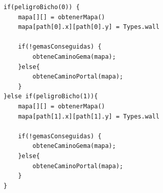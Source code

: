 \documentclass[titlepage]{article}
\begin{document}
\begin{enumerate}
\begin{lstlisting}
if(peligroBicho(0)) {
	mapa[][] = obtenerMapa()
	mapa[path[0].x][path[0].y] = Types.wall
	
	if(!gemasConseguidas) {
		obteneCaminoGema(mapa);
	}else{
		obteneCaminoPortal(mapa);
	}
}else if(peligroBicho(1)){
	mapa[][] = obtenerMapa()
	mapa[path[1].x][path[1].y] = Types.wall
	
	if(!gemasConseguidas) {
		obteneCaminoGema(mapa);
	}else{
		obteneCaminoPortal(mapa);
	}
}

\end{lstlisting}	
	\end{enumerate}
	
	
	
	
	
	


	
	
	
	
	
	
	
	
 
  
\end{document}
